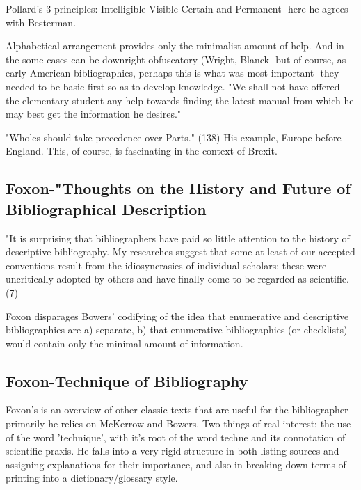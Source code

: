 \documentclass[course, english]{Notes}
\begin{document}
\begin{outline}
\1 Pollard's 3 principles:
	\2 Intelligible
	\2 Visible
	\2 Certain and Permanent- here he agrees with Besterman. 
	
\1 Alphabetical arrangement provides only the minimalist amount of help. And in the some cases can be downright obfuscatory (Wright, Blanck- but of course, as early American bibliographies, perhaps this is what was most important- they needed to be basic first so as to develop knowledge.
	\2 "We shall not have offered the elementary student any help towards finding the latest manual from which he may best get the information he desires."
	
\1 "Wholes should take precedence over Parts." (138)
	\2 His example, Europe before England. This, of course, is fascinating in the context of Brexit. 

\end{outline}

\subsection{Foxon-"Thoughts on the History and Future of Bibliographical Description}
\begin{outline}
\1 "It is surprising that bibliographers have paid so little attention to the history of descriptive bibliography. My researches suggest that some at least of our accepted conventions result from the idiosyncrasies of individual scholars; these were uncritically adopted by others and have finally come to be regarded as scientific.  (7)

\1 Foxon disparages Bowers' codifying of the idea that enumerative and descriptive bibliographies are a) separate, b) that enumerative bibliographies (or checklists) would contain only the minimal amount of information. 
\end{outline}

\subsection{Foxon-Technique of Bibliography}
\begin{outline}
\1 Foxon's is an overview of other classic texts that are useful for the bibliographer- primarily he relies on McKerrow and Bowers. 
\1 Two things of real interest: 
	\2 the use of the word 'technique', with it's root of the word techne and its connotation of scientific praxis.
	\2 He falls into a very rigid structure in both listing sources and assigning explanations for their importance, and also in breaking down terms of printing into a dictionary/glossary style. 
\end{outline}
\end{document}
